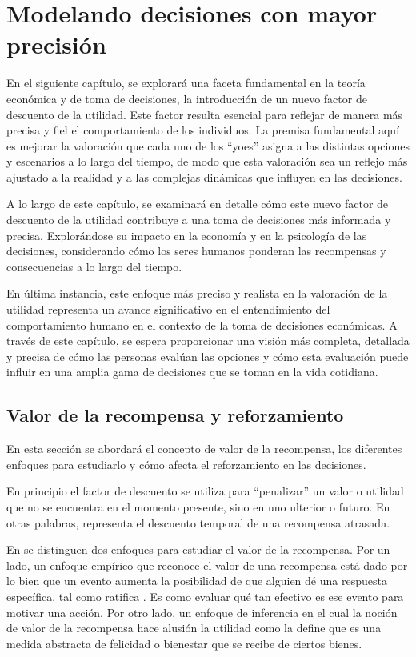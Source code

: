 \chapter{Modelando decisiones con mayor precisión} \label{cap_5}
En el siguiente capítulo, se explorará una faceta fundamental en la teoría económica y de toma de decisiones, la introducción de un nuevo factor de descuento de la utilidad. Este factor resulta esencial para reflejar de manera más precisa y fiel el comportamiento de los individuos. La premisa fundamental aquí es mejorar la valoración que cada uno de los “yoes” asigna a las distintas opciones y escenarios a lo largo del tiempo, de modo que esta valoración sea un reflejo más ajustado a la realidad y a las complejas dinámicas que influyen en las decisiones.

A lo largo de este capítulo, se examinará en detalle cómo este nuevo factor de descuento de la utilidad contribuye a una toma de decisiones más informada y precisa. Explorándose su impacto en la economía y en la psicología de las decisiones, considerando cómo los seres humanos ponderan las recompensas y consecuencias a lo largo del tiempo. 

En última instancia, este enfoque más preciso y realista en la valoración de la utilidad representa un avance significativo en el entendimiento del comportamiento humano en el contexto de la toma de decisiones económicas. A través de este capítulo, se espera proporcionar una visión más completa, detallada y precisa de cómo las personas evalúan las opciones y cómo esta evaluación puede influir en una amplia gama de decisiones que se toman en la vida cotidiana.


\section{Valor de la recompensa y reforzamiento}
En esta sección se abordará el concepto de valor de la recompensa, los diferentes enfoques para estudiarlo y cómo afecta el reforzamiento en las decisiones.

En principio el factor de descuento se utiliza para “penalizar”  un valor o utilidad que no se encuentra en el momento presente, sino en uno ulterior o futuro. En otras palabras, representa el descuento temporal de una recompensa atrasada.


En \parencite{buritica2016valor} se distinguen dos enfoques para estudiar el valor de la recompensa. Por un lado, un enfoque empírico que reconoce el valor de una recompensa está dado por lo bien que un evento aumenta la posibilidad de que alguien dé una respuesta específica, tal como ratifica  \parencite{mazur2001hyperbolic}. Es como evaluar qué tan efectivo es ese evento para motivar una acción. Por otro lado, un enfoque de inferencia en el cual la noción de valor de la recompensa hace alusión la utilidad como la define \parencite{mankiw2012} que es una medida abstracta de  felicidad o bienestar que se recibe de ciertos bienes.

